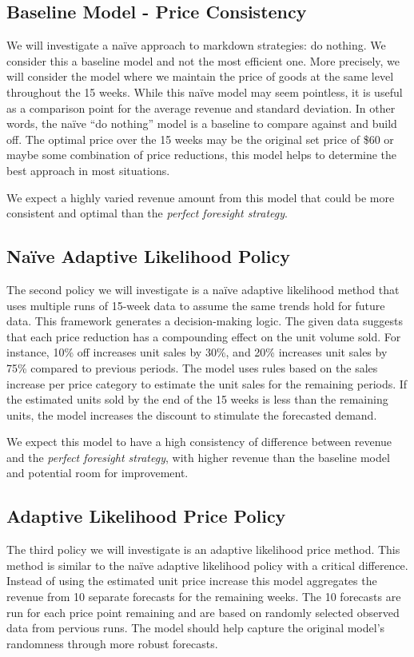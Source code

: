 \documentclass[11pt,a4paper]{article}
\begin{document}
\subsection{Baseline Model - Price Consistency}
We will investigate a naïve approach to markdown strategies: do nothing. 
We consider this a baseline model and not the most efficient one. 
More precisely, we will consider the model where we maintain the price of goods at the same level throughout the 15 weeks. 
While this naïve model may seem pointless, it is useful as a comparison point for the average revenue and standard deviation. 
In other words, the naïve “do nothing” model is a baseline to compare against and build off. 
The optimal price over the 15 weeks may be the original set price of \$60 or maybe some combination of price reductions, this model helps to determine the best approach in most situations.

We expect a highly varied revenue amount from this model that could be more consistent and optimal than the \emph{perfect foresight strategy}.

\subsection{Naïve Adaptive Likelihood Policy}
The second policy we will investigate is a naïve adaptive likelihood method that uses multiple runs of 15-week data to assume the same trends hold for future data. 
This framework generates a decision-making logic. The given data suggests that each price reduction has a compounding effect on the unit volume sold. For instance, 10\% off increases unit sales by 30\%, and 20\% increases unit sales by 75\% compared to previous periods. 
The model uses rules based on the sales increase per price category to estimate the unit sales for the remaining periods. 
If the estimated units sold by the end of the 15 weeks is less than the remaining units, the model increases the discount to stimulate the forecasted demand. 

We expect this model to have a high consistency of difference between revenue and the \emph{perfect foresight strategy}, with higher revenue than the baseline model and potential room for improvement.

\subsection{Adaptive Likelihood Price Policy}
The third policy we will investigate is an adaptive likelihood price method. 
This method is similar to the naïve adaptive likelihood policy with a critical difference. 
Instead of using the estimated unit price increase this model aggregates the revenue from 10 separate forecasts for the remaining weeks. 
The 10 forecasts are run for each price point remaining and are based on randomly selected observed data from pervious runs.  
The model should help capture the original model’s randomness through more robust forecasts. 
\end{document}
